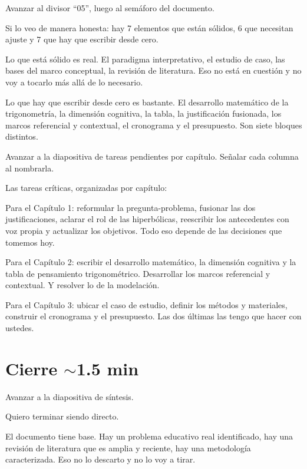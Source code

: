 \documentclass[11pt, letterpaper]{article}
\newenvironment{accion}{%
  \par\smallskip
  \color{GrisAnotacion}\small\itshape\faHandPointRight\enspace
}{%
  \par\smallskip\normalcolor\normalsize\normalfont
}
\begin{document}
\begin{accion}
  Avanzar al divisor ``05'', luego al semáforo del documento.
\end{accion}

Si lo veo de manera honesta: hay 7 elementos que están sólidos, 6 que necesitan ajuste y 7 que hay que escribir desde cero.

Lo que está sólido es real. El paradigma interpretativo, el estudio de caso, las bases del marco conceptual, la revisión de literatura. Eso no está en cuestión y no voy a tocarlo más allá de lo necesario.

Lo que hay que escribir desde cero es bastante. El desarrollo matemático de la trigonometría, la dimensión cognitiva, la tabla, la justificación fusionada, los marcos referencial y contextual, el cronograma y el presupuesto. Son siete bloques distintos.

\begin{accion}
  Avanzar a la diapositiva de tareas pendientes por capítulo.
  Señalar cada columna al nombrarla.
\end{accion}

Las tareas críticas, organizadas por capítulo:

Para el Capítulo 1: reformular la pregunta-problema, fusionar las dos justificaciones, aclarar el rol de las hiperbólicas, reescribir los antecedentes con voz propia y actualizar los objetivos. Todo eso depende de las decisiones que tomemos hoy.

Para el Capítulo 2: escribir el desarrollo matemático, la dimensión cognitiva y la tabla de pensamiento trigonométrico. Desarrollar los marcos referencial y contextual. Y resolver lo de la modelación.

Para el Capítulo 3: ubicar el caso de estudio, definir los métodos y materiales, construir el cronograma y el presupuesto. Las dos últimas las tengo que hacer con ustedes.

\section{Cierre \hfill {\normalfont\small\color{GrisAnotacion}$\sim$1.5 min}}

\begin{accion}
  Avanzar a la diapositiva de síntesis.
\end{accion}

Quiero terminar siendo directo.

El documento tiene base. Hay un problema educativo real identificado, hay una revisión de literatura que es amplia y reciente, hay una metodología caracterizada. Eso no lo descarto y no lo voy a tirar.
\end{document}
